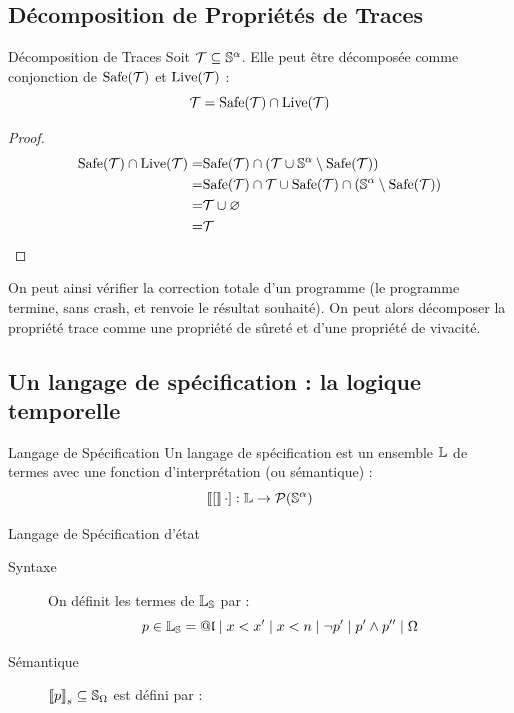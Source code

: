 \documentclass{cours}
\begin{document}
\subsection{Décomposition de Propriétés de Traces}
\begin{théorème}{Décomposition de Traces}{}
Soit $\mathcal{T} \subseteq \mathbb{S}^{\alpha}$. Elle peut être décomposée comme conjonction de $\rm Safe(\mathcal{T})$ et $\rm Live(\mathcal{T})$ :
\[
	\mathcal{T} = \rm Safe(\mathcal{T}) \cap Live(\mathcal{T})
\]
\end{théorème}
\begin{proof}
	\[
		\begin{aligned}
			\rm Safe(\mathcal{T}) \cap Live(\mathcal{T}) = & \rm Safe(\mathcal{T}) \cap \left(\mathcal{T} \cup \mathbb{S}^{\alpha} \setminus Safe(\mathcal{T})\right)                \\
			=                              & \rm Safe(\mathcal{T}) \cap \mathcal{T} \cup Safe(\mathcal{T}) \cap \left(\mathbb{S}^{\alpha} \setminus Safe(\mathcal{T})\right) \\
			=                              & \mathcal{T} \cup \varnothing                                                                      \\
			=                              & \mathcal{T}
		\end{aligned}
	\]
\end{proof}

On peut ainsi vérifier la correction totale d'un programme (le programme termine, sans crash, et renvoie le résultat souhaité). On peut alors décomposer la propriété trace comme une propriété de sûreté et d'une propriété de vivacité.

\subsection{Un langage de spécification : la logique temporelle}
\begin{définition}{Langage de Spécification}{}
Un langage de spécification est un ensemble $\mathbb{L}$ de termes avec une fonction d'interprétation (ou sémantique) :
\[
	\left\llbracket [ \right\rrbracket\cdot] : \mathbb{L} \to \mathcal{P}(\mathbb{S}^{\alpha})
\]
\end{définition}

\begin{propositionfr}{Langage de Spécification d'état}{}
	\begin{description}
		\item[Syntaxe] On définit les termes de $\mathbb{L}_{\mathbb{S}}$ par :
		      \[
			      p \in \mathbb{L}_{\mathbb{S}} = \mathfrak{@l} \mid x < x' \mid x < n\mid \lnot p' \mid p' \land p'' \mid \Omega
		      \]
		\item[Sémantique] $\left\llbracket p \right\rrbracket_{s} \subseteq \mathbb{S}_{\Omega}$ est défini par :
	\end{description}
\end{propositionfr}
\end{document}

